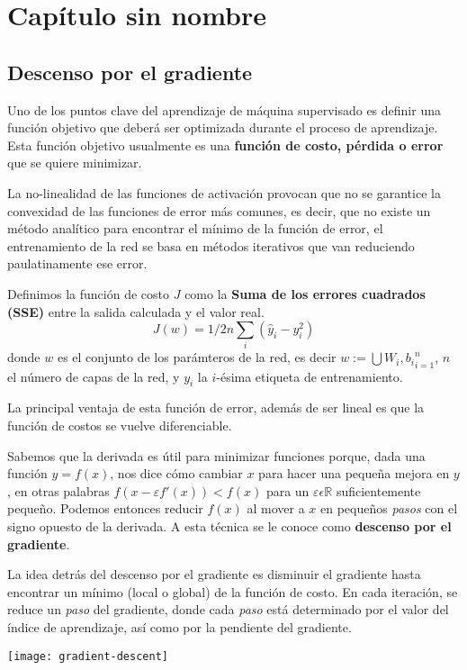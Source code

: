\section{Capítulo sin nombre}
\subsection{Descenso por el gradiente}
Uno de los puntos clave del aprendizaje de máquina supervisado es
definir una función objetivo que deberá ser optimizada durante el
proceso de aprendizaje. Esta función objetivo usualmente es una
\textbf{función de costo, pérdida o error} que se quiere minimizar.

La no-linealidad de las funciones de activación provocan que no se garantice la convexidad
de las funciones de error más comunes, es decir, que no existe un método analítico para
encontrar el mínimo de la función de error, el entrenamiento de la red se basa en
métodos iterativos que van reduciendo paulatinamente ese error. 

Definimos la función de costo $J$ como la \textbf{Suma de
  los errores cuadrados (SSE)} entre la salida calculada y el valor
real.
\begin{equation}
  J(w)=1/2n \sum_i (\hat{y}_i - y_i^2)
\end{equation}
donde $w$ es el conjunto de los parámteros de la red, es decir
$w := \bigcup{W_i, b_i}_{i=1}^{n}$, $n$ el número de capas de la red, y $y_i$
la $i$-ésima etiqueta de entrenamiento.

La principal ventaja de esta función de error, además de ser lineal
es que la función de costos se vuelve diferenciable.

Sabemos que la derivada es útil para minimizar funciones porque, dada una función
$y = f(x)$, nos dice cómo cambiar $x$ para hacer una pequeña mejora en $y$, en
otras palabras $f(x-\varepsilon f'(x)) < f(x)$ para un $\varepsilon \epsilon \mathbb{R}$
suficientemente pequeño. Podemos entonces reducir $f(x)$ al mover a $x$ en pequeños
\textit{pasos} con el signo opuesto de la derivada. A esta técnica se le conoce como
\textbf{descenso por el gradiente}.

La idea detrás del descenso por el gradiente es disminuir el gradiente hasta encontrar
un mínimo (local o global) de la función de costo. En cada iteración, se reduce
un \textit{paso} del gradiente, donde cada \textit{paso} está determinado por
el valor del índice de aprendizaje, así como por la pendiente del gradiente.

\texttt{[image: gradient-descent]}

